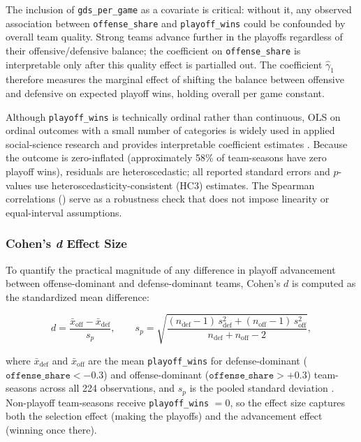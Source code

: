 The inclusion of \texttt{gds\_per\_game} as a covariate is critical: without
it, any observed association between \texttt{offense\_share} and
\texttt{playoff\_wins} could be confounded by overall team quality. Strong
teams advance further in the playoffs regardless of their offensive/defensive
balance; the coefficient on \texttt{offense\_share} is interpretable only after
this quality effect is partialled out. The coefficient $\hat{\gamma}_1$
therefore measures the marginal effect of shifting the balance between offensive
and defensive \xvoa{} on expected playoff wins, holding overall \gds{} per game
constant.

Although \texttt{playoff\_wins} is technically ordinal rather than continuous,
OLS on ordinal outcomes with a small number of categories is widely used in
applied social-science research and provides interpretable coefficient estimates
\parencite{long1997regression}. Because the outcome is zero-inflated
(approximately 58\% of team-seasons have zero playoff wins), residuals are
heteroscedastic; all reported standard errors and $p$-values use
heteroscedasticity-consistent (HC3) estimates. The Spearman correlations
() serve as a robustness check that does not impose
linearity or equal-interval assumptions.

\subsubsection{Cohen's \textit{d} Effect Size}
\label{sec:cohens-d}

To quantify the practical magnitude of any difference in playoff advancement
between offense-dominant and defense-dominant teams, Cohen's $d$ is computed
as the standardized mean difference:

\begin{equation}
  \label{eq:cohens-d}
  d = \frac{\bar{x}_{\mathrm{off}} - \bar{x}_{\mathrm{def}}}{s_p},
  \qquad
  s_p = \sqrt{\frac{(n_{\mathrm{def}} - 1)\,s_{\mathrm{def}}^2
                    + (n_{\mathrm{off}} - 1)\,s_{\mathrm{off}}^2}
                   {n_{\mathrm{def}} + n_{\mathrm{off}} - 2}},
\end{equation}

where $\bar{x}_{\mathrm{def}}$ and $\bar{x}_{\mathrm{off}}$ are the mean
\texttt{playoff\_wins} for defense-dominant
($\texttt{offense\_share} < -0.3$) and offense-dominant
($\texttt{offense\_share} > +0.3$) team-seasons across all 224 observations, and
$s_p$ is the pooled standard deviation \parencite{cohen1988statisticalpower}.
Non-playoff team-seasons receive \texttt{playoff\_wins} $= 0$, so the effect
size captures both the selection effect (making the playoffs) and the
advancement effect (winning once there).

